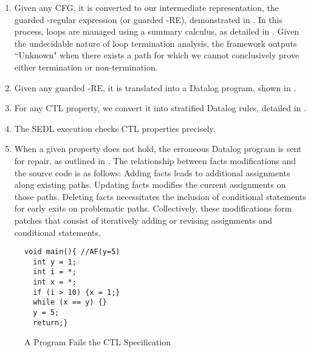 \begin{enumerate}[wide]
\item Given any CFG, it is converted 
to our intermediate representation, \ie the guarded \code{\omega}-regular expression (or guarded \code{\omega}-RE), demonstrated in . 
In this process, loops are managed using a summary calculus, as detailed in . Given the undecidable nature of loop termination analysis, the framework outputs ``Unknown" when there exists a path for which we cannot conclusively prove either termination or non-termination. 

\item Given any guarded \code{\omega}-RE, it is translated into a Datalog program, shown in . 

\item For any CTL property, we convert it into stratified Datalog rules, detailed in . 


\item The SEDL execution checks CTL properties precisely. 



\item 
When a given property does not hold, the erroneous Datalog program is sent for repair, as outlined in . The relationship between facts modifications and the source code is as follows: 
Adding facts leads to additional assignments along existing paths.
Updating facts modifies the current assignments on those paths.
Deleting facts necessitates the inclusion of conditional statements for early exits on problematic paths.
Collectively, these modifications form patches that consist of iteratively adding or revising assignments and conditional statements. 


\end{enumerate}


\begin{figure}[!b]
\centering
\vspace{-5mm}
\centering
\begin{lstlisting}[xleftmargin=9em,numbersep=6pt, name=intro,basicstyle=\footnotesize\ttfamily]
void main(){ //AF(y=5)
  int y = 1; 
  int i = *; 
  int x = *;
  if (i > 10) {x = 1;}
  while (x == y) {} 
  y = 5; 
  return;}
\end{lstlisting} 
\vspace{-1mm}
\caption{A Program Fails the CTL Specification}
\label{fig:first_Example}
\end{figure}



